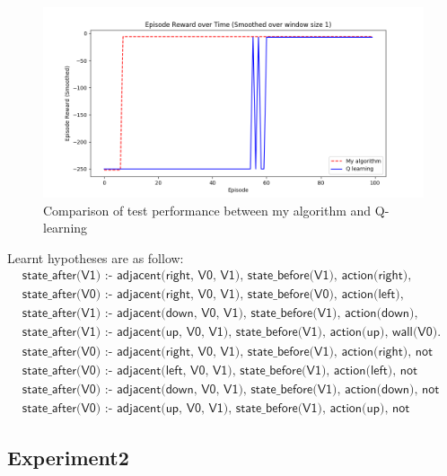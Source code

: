 \begin{figure}[!htb]
\centering
\includegraphics[width=1.0\textwidth]{./figures/experiment1_test}
\caption{Comparison of test performance between my algorithm and Q-learning}
\label{experiment1_test}
\end{figure}

Learnt hypotheses are as follow:
\begin{equation*}
\begin{split}
&\textsf{state\_after(V1) :- adjacent(right, V0, V1), state\_before(V1), action(right), wall(V0).}\\
&\textsf{state\_after(V0) :- adjacent(right, V0, V1), state\_before(V0), action(left), wall(V1).}\\
&\textsf{state\_after(V1) :- adjacent(down, V0, V1), state\_before(V1), action(down), wall(V0).}\\
&\textsf{state\_after(V1) :- adjacent(up, V0, V1), state\_before(V1), action(up), wall(V0).}\\
&\textsf{state\_after(V0) :- adjacent(right, V0, V1), state\_before(V1), action(right), not wall(V0).}\\
&\textsf{state\_after(V0) :- adjacent(left, V0, V1), state\_before(V1), action(left), not wall(V0).}\\
&\textsf{state\_after(V0) :- adjacent(down, V0, V1), state\_before(V1), action(down), not wall(V0).}\\
&\textsf{state\_after(V0) :- adjacent(up, V0, V1), state\_before(V1), action(up), not wall(V0).}
\end{split}
\end{equation*}


\subsection{Experiment2}

